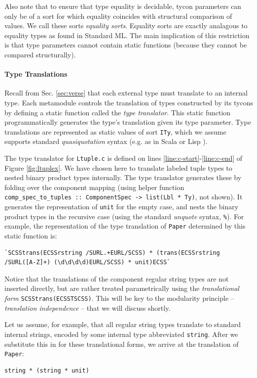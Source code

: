 Also note that to ensure that type equality is decidable, tycon parameters can only be of a sort for which equality coincides with structural comparison of values. We call these sorts \emph{equality sorts}. Equality sorts are exactly analagous to equality types as found in Standard ML. The main implication of this restriction is that type parameters cannot contain static functions (because they cannot be compared structurally).

\paragraph{Type Translations} Recall from Sec. \ref{sec:verse} that each external type must translate to an internal type. Each metamodule controls the translation of types constructed by its tycons by defining a static function called the \emph{type translator}. This static function programmatically generates the type's translation given its type parameter. Type translations are represented as static values of sort \lstinline{ITy}, which we assume supports standard \emph{quasiquotation} syntax (e.g. as in Scala \cite{shabalin2013quasiquotes} or Lisp \cite{Bawd99a}).

The  type translator for \lstinline{Ltuple.c} is defined on lines \ref{line:c-start}-\ref{line:c-end} of Figure \ref{fig:ltuplex}. We have chosen here to translate labeled tuple types to nested binary product types internally. The type translator generates these by folding over the component mapping (using helper function \lstinline{comp_spec_to_tuples :: ComponentSpec -> list(Lbl * Ty)}, not shown). It generates the representation of \lstinline{unit} for the empty case, and nests the binary product types in the recursive case (using the standard \emph{unquote} syntax, \lstinline{%}). 
For example, the representation of the type translation of \lstinline{Paper} determined by this static function is:
\begin{lstlisting}[numbers=none]
`SCSStrans(ECSSrstring /SURL.+EURL/SCSS) * (trans(ECSSrstring /SURL([A-Z]+) (\d\d\d\d)EURL/SCSS) * unit)ECSS`
\end{lstlisting}
Notice that the translations of the component regular string types are not inserted directly, but are rather treated {parametrically} using the \emph{translational form} \lstinline{SCSStrans(ECSSTSCSS)}. This will be key to the modularity principle -- \emph{translation independence} -- that we will discuss shortly.%

Let us assume, for example, that all regular string types translate to standard internal strings, encoded by some internal type abbreviated \lstinline{string}. After we substitute this in for these translational forms, we arrive at the translation of \lstinline{Paper}:
\begin{lstlisting}[numbers=none]
string * (string * unit)
\end{lstlisting}

